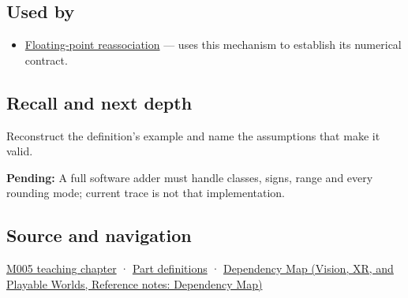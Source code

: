\subsection{Used by}\label{appendix-a1b1b4580dfd-used-by}

\hypertarget{appendix-a1b1b4580dfd-used-by}{}

\begin{itemize}
\tightlist
\item
  \hyperref[appendix-c2ac4a84c283]{Floating-point reassociation} --- uses this mechanism to establish its numerical contract.
\end{itemize}

\subsection{Recall and next depth}\label{appendix-a1b1b4580dfd-recall-and-next-depth}

\hypertarget{appendix-a1b1b4580dfd-recall-and-next-depth}{}

Reconstruct the definition's example and name the assumptions that make it valid.

\textbf{Pending:} A full software adder must handle classes, signs, range and every rounding mode; current trace is not that implementation.

\subsection{Source and navigation}\label{appendix-a1b1b4580dfd-source-and-navigation}

\hypertarget{appendix-a1b1b4580dfd-source-and-navigation}{}

\hyperref[01-foundations-i-ch001-when-arithmetic-meets-uncertainty]{M005 teaching chapter} · \hyperref[appendix-fd090d982a15-m005---parts-77-88]{Part definitions} · \href{../07-Vision-XR-and-Playable-Worlds/main.pdf\#nameddest=appendix-4ad47bdd269a}{Dependency Map (Vision, XR, and Playable Worlds, Reference notes: Dependency Map)}
